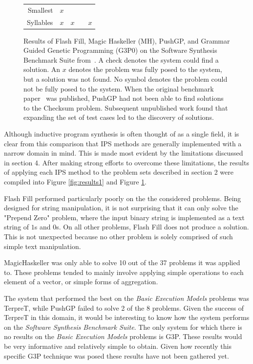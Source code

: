 \begin{figure}
\begin{tabular}{ r | c c c c }
	Smallest & $x$ & \checkmark & \checkmark & \checkmark \\
	Syllables & $x$ & $x$ & \checkmark & $x$ \\
\end{tabular}
\caption{Results of Flash Fill, Magic Haskeller (MH), PushGP, and Grammar Guided Genetic Programming (G3P0) on the Software Synthesis Benchmark Suite from~\cite{Helmuth2015b}. A check denotes the system could find a solution. An $x$ denotes the problem was fully posed to the system, but a solution was not found. No symbol denotes the problem could not be fully posed to the system. When the original benchmark paper~\cite{Helmuth2015b} was published, PushGP had not been able to find solutions to the Checksum problem. Subsequent unpublished work found that expanding the set of test cases led to the discovery of solutions.}
\label{fig:results2}
\end{figure}

Although inductive program synthesis is often thought of as a single field, it is clear from this comparison that IPS methods are generally implemented with a narrow domain in mind. This is made most evident by the limitations discussed in section 4. After making strong efforts to overcome these limitations, the results of applying each IPS method to the problem sets described in section 2 were compiled into Figure \ref{fig:results1} and Figure \ref{fig:results2}.

Flash Fill performed particularly poorly on the the considered problems. Being designed for string manipulation, it is not surprising that it can only solve the "Prepend Zero" problem, where the input binary string is implemented as a text string of $1$s and $0$s. On all other problems, Flash Fill does not produce a solution. This is not unexpected because no other problem is solely comprised of such simple text manipulation.

MagicHaskeller was only able to solve 10 out of the 37 problems it was applied to. These problems tended to mainly involve applying simple operations to each element of a vector, or simple forms of aggregation.

The system that performed the best on the \emph{Basic Execution Models} problems was TerpreT, while PushGP failed to solve 2 of the 8 problems. Given the success of TerpreT in this domain, it would be interesting to know how the system performs on the \emph{Software Synthesis Benchmark Suite}. The only system for which there is no results on the \emph{Basic Execution Models} problems is G3P. These results would be very informative and relatively simple to obtain. Given how recently this specific G3P technique was posed these results have not been gathered yet.

